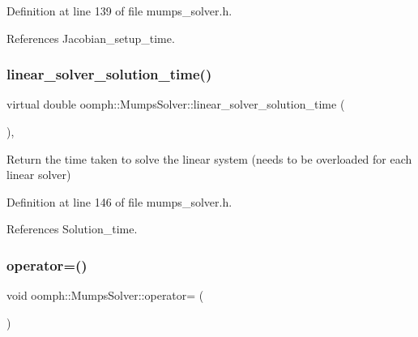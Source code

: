 Definition at line 139 of file mumps\+\_\+solver.\+h.



References Jacobian\+\_\+setup\+\_\+time.

\mbox{\label{classoomph_1_1MumpsSolver_a52e765662a0e2cbd81dc5dc280905604}} 
\subsubsection{\texorpdfstring{linear\+\_\+solver\+\_\+solution\+\_\+time()}{linear\_solver\_solution\_time()}}
{\footnotesize\ttfamily virtual double oomph\+::\+Mumps\+Solver\+::linear\+\_\+solver\+\_\+solution\+\_\+time (\begin{DoxyParamCaption}{ }\end{DoxyParamCaption})\hspace{0.3cm}{\ttfamily [inline]}, {\ttfamily [virtual]}}



Return the time taken to solve the linear system (needs to be overloaded for each linear solver) 



Definition at line 146 of file mumps\+\_\+solver.\+h.



References Solution\+\_\+time.

\mbox{\label{classoomph_1_1MumpsSolver_aabd9e13bf639979489557b9af141eb5d}} 
\subsubsection{\texorpdfstring{operator=()}{operator=()}}
{\footnotesize\ttfamily void oomph\+::\+Mumps\+Solver\+::operator= (\begin{DoxyParamCaption}\item[{const \hyperlink{classoomph_1_1MumpsSolver}{Mumps\+Solver} \&}]{ }\end{DoxyParamCaption})\hspace{0.3cm}{\ttfamily [inline]}}



